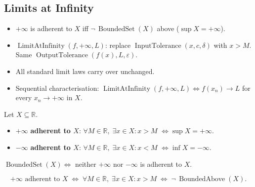 
\subsection{Limits at Infinity}
\label{sec:limits-at-infinity}

\begin{tcolorbox}[title={Toolkit --- Limits at Infinity}]
\begin{itemize}
  \item $+\infty$ is adherent to $X$ iff $\neg\,\operatorname{BoundedSet}(X)$
    above ($\sup X=+\infty$).
  \item $\operatorname{LimitAtInfinity}(f,+\infty,L)$: replace
    $\operatorname{InputTolerance}(x,c,\delta)$ with $x>M$.
    Same $\operatorname{OutputTolerance}(f(x),L,\varepsilon)$.
  \item All standard limit laws carry over unchanged.
  \item Sequential characterisation: $\operatorname{LimitAtInfinity}
    (f,+\infty,L)\iff f(x_n)\to L$ for every $x_n\to+\infty$ in $X$.
\end{itemize}
\end{tcolorbox}


\begin{tcolorbox}[title={Definition --- Infinite Adherent Points}]
\begin{definition}
\label{def:infinite-adherent-points}
Let $X\subseteq\mathbb{R}$.
\begin{itemize}
  \item $+\infty$ \textbf{adherent to $X$}: $\forall M\in\mathbb{R},\;
    \exists x\in X:x>M$ $\iff\sup X=+\infty$.
  \item $-\infty$ \textbf{adherent to $X$}: $\forall M\in\mathbb{R},\;
    \exists x\in X:x<M$ $\iff\inf X=-\infty$.
\end{itemize}
$\operatorname{BoundedSet}(X)\iff$ neither $+\infty$ nor $-\infty$
is adherent to $X$.
\end{definition}
\end{tcolorbox}

\begin{remark*}
\[
  +\infty\text{ adherent to }X
  \;\iff\;
  \forall M\in\mathbb{R},\;\exists x\in X:x>M
  \;\iff\;
  \neg\,\operatorname{BoundedAbove}(X).
\]
\end{remark*}

